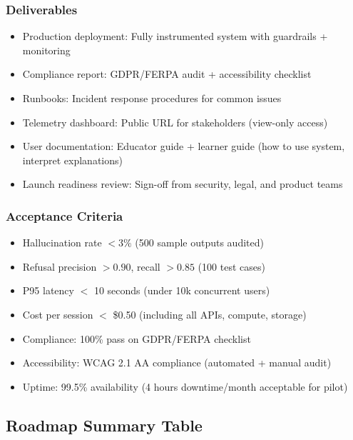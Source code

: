 \documentclass[11pt,letterpaper]{article}
\begin{document}
\subsubsection{Deliverables}
\begin{itemize}
\item Production deployment: Fully instrumented system with guardrails + monitoring
\item Compliance report: GDPR/FERPA audit + accessibility checklist
\item Runbooks: Incident response procedures for common issues
\item Telemetry dashboard: Public URL for stakeholders (view-only access)
\item User documentation: Educator guide + learner guide (how to use system, interpret explanations)
\item Launch readiness review: Sign-off from security, legal, and product teams
\end{itemize}

\subsubsection{Acceptance Criteria}
\begin{itemize}
\item Hallucination rate $< 3\%$ (500 sample outputs audited)
\item Refusal precision $> 0.90$, recall $> 0.85$ (100 test cases)
\item P95 latency $<$ 10 seconds (under 10k concurrent users)
\item Cost per session $<$ \$0.50 (including all APIs, compute, storage)
\item Compliance: 100\% pass on GDPR/FERPA checklist
\item Accessibility: WCAG 2.1 AA compliance (automated + manual audit)
\item Uptime: 99.5\% availability (4 hours downtime/month acceptable for pilot)
\end{itemize}

\subsection{Roadmap Summary Table}
\end{document}
